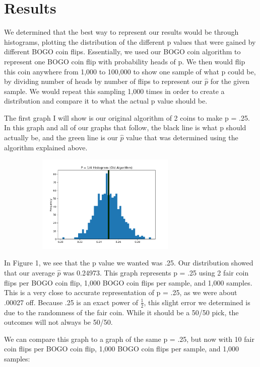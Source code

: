 \documentclass[11pt]{article}
\begin{document}
\section*{Results}

\quad We determined that the best way to represent our results would be through histograms, plotting
the distribution of the different p values that were gained by different BOGO coin flips. Essentially, we
used our BOGO coin algorithm to represent one BOGO coin flip with probability heads of p. We then would flip
this coin anywhere from 1,000 to 100,000 to show one sample of what p could be, by dividing number of heads
by number of flips to represent our $\hat{p}$ for the given sample. We would repeat this sampling 1,000 times
in order to create a distribution and compare it to what the actual p value should be.

The first graph I will show is our original algorithm of 2 coins to make p = .25. In this graph and all of
our graphs that follow, the black line is what p should actually be, and the green line is our $\hat{p}$ 
value that was determined using the algorithm explained above.

\begin{figure}[h]
    \caption
    \centering
    \includegraphics[width=8.5cm, height=4.7cm]{25-1000-old.png}
    \centering
\end{figure}


In Figure 1, we see that the p value we wanted was .25. Our distribution showed that our average $\hat{p}$
was 0.24973. This graph represents p = .25 using 2 fair coin flips per BOGO coin flip, 1,000 BOGO coin flips
per sample, and 1,000 samples. This is a very close to accurate representation of p = .25, as we were about
.00027 off. Because .25 is an exact power of $\frac{1}{2}$, this slight error we determined is due to the 
randomness of the fair coin. While it should be a 50/50 pick, the outcomes will not always be 50/50.

We can compare this graph to a graph of the same p = .25, but now with 10 fair coin flips per BOGO coin flip, 
1,000 BOGO coin flips per sample, and 1,000 samples:
\end{document}
